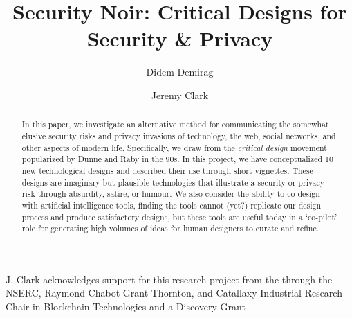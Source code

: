 \documentclass[manuscript]{acmart}
\begin{document}
\title{Security Noir: Critical Designs for Security \& Privacy}

\author{Didem Demirag}


\author{Jeremy Clark}

\begin{abstract}

In this paper, we investigate an alternative method for communicating the somewhat elusive security risks and privacy invasions of technology, the web, social networks, and other aspects of modern life. Specifically, we draw from the \textit{critical design} movement popularized by Dunne and Raby in the 90s. In this project, we have conceptualized 10 new technological designs and described their use through short vignettes. These designs are imaginary but plausible technologies that illustrate a security or privacy risk through absurdity, satire, or humour. We also consider the ability to co-design with artificial intelligence tools, finding the tools cannot (yet?) replicate our design process and produce satisfactory designs, but these tools are useful today in a `co-pilot' role for generating high volumes of ideas for human designers to curate and refine. 

\end{abstract}

\maketitle






\begin{anonsuppress}
\begin{acks}
%
J. Clark acknowledges support for this research project from the  through the NSERC, Raymond Chabot Grant Thornton, and Catallaxy Industrial Research Chair in Blockchain Technologies  and a Discovery Grant 
%
%
\end{acks}
\end{anonsuppress}




\end{document}
